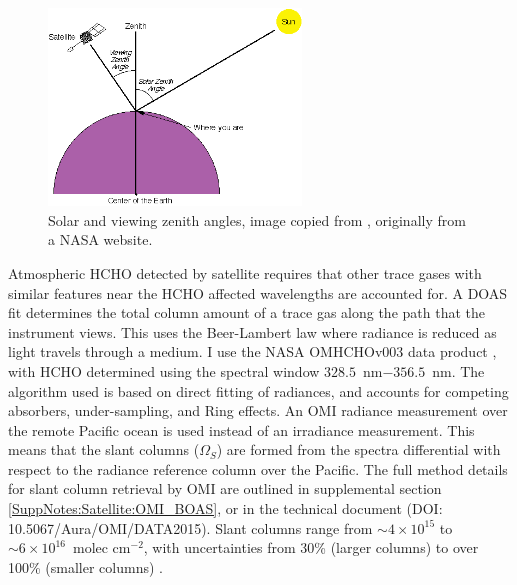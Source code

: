   
  \begin{figure}\begin{center}
      \includegraphics[width=0.6\textwidth]{Figures/ZenithAngles.png}
      \caption{Solar and viewing zenith angles, image copied from \textcite{SZA_Image}, originally from a NASA website.}
      \label{ch_HCHO:fig:zenithangle}
    \end{center}\end{figure}
  
  Atmospheric HCHO detected by satellite requires that other trace gases with similar features near the HCHO affected wavelengths are accounted for.
  A DOAS fit determines the total column amount of a trace gas along the path that the instrument views.
  This uses the Beer-Lambert law where radiance is reduced as light travels through a medium.
  I use the NASA OMHCHOv003 data product \parencite{Abad2015}, with HCHO determined using the spectral window $328.5$~nm$ - 356.5$~nm. 
  The algorithm used is based on direct fitting of radiances, and accounts for competing absorbers, under-sampling, and Ring effects.
  An OMI radiance measurement over the remote Pacific ocean is used instead of an irradiance measurement.
  This means that the slant columns ($\Omega_S$) are formed from the spectra differential with respect to the radiance reference column over the Pacific.
  The full method details for slant column retrieval by OMI are outlined in supplemental section \ref{SuppNotes:Satellite:OMI_BOAS}, or in the technical document (DOI: 10.5067/Aura/OMI/DATA2015).
  Slant columns range from $\sim 4\times 10^{15} $ to $\sim 6 \times 10^{16}$~molec cm$^{-2}$, with uncertainties from 30\% (larger columns) to over 100\% (smaller columns) \parencite{Abad2015}.
  
